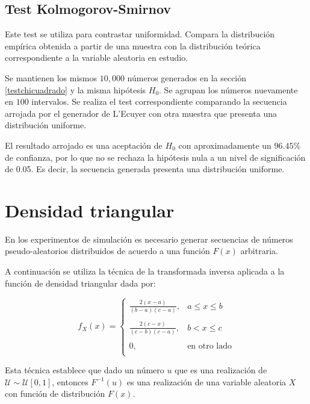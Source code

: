 \documentclass{sig-alternate}
\begin{document}

\subsection{Test Kolmogorov-Smirnov}\label{testks}

Este test se utiliza para contrastar uniformidad. Compara la distribuci\'{o}n
emp\'{i}rica obtenida a partir de una muestra con la distribuci\'{o}n te\'{o}rica
correspondiente a la variable aleatoria en estudio.

Se mantienen los mismos $10,000$ n\'{u}meros generados en la secci\'{o}n
\ref{testchicuadrado} y la misma hip\'{o}tesis $H_{0}$. Se agrupan los n\'{u}meros
nuevamente en $100$ intervalos. Se realiza el test
correspondiente comparando la secuencia arrojada por el generador de L'Ecuyer
con otra muestra que presenta una distribuci\'{o}n uniforme. 

El resultado
arrojado es una aceptaci\'{o}n de $H_{0}$ con aproximadamente un $96.45\%$
de confianza, por lo que no se rechaza la hip\'{o}tesis nula a un nivel de 
significaci\'{o}n de 0.05. Es decir, la secuencia generada presenta una 
distribuci\'{o}n uniforme.

\section{Densidad triangular}\label{triangular}

En los experimentos de simulaci\'{o}n es necesario generar secuencias de
n\'{u}meros pseudo-aleatorios distribuidos de acuerdo a una funci\'{o}n $F(x)$
arbitraria.

A continuaci\'{o}n se utiliza la t\'{e}cnica de la transformada inversa
aplicada a la funci\'{o}n de densidad triangular dada por:

\begin{equation}
\label{triangularEc}
f_{X}(x) = 
    \begin{cases}
    \frac{2(x-a)}{(b-a)(c-a)}, &  a \le x \le b\\
     \ \\
    \frac{2(c-x)}{(c-b)(c-a)}, & b < x \le c\\
     \ \\
     0, & \text{en otro lado}\\
    \end{cases}
\end{equation}

Esta t\'{e}cnica establece que dado un n\'{u}mero $u$ que es una realizaci\'{o}n
de $\mathcal{U} \sim \mathcal{U}[0,1]$, entonces $F^{-1}(u)$ es una
realizaci\'{o}n de una variable aleatoria $X$ con funci\'{o}n de distribuci\'{o}n
$F(x)$.
\end{document}
